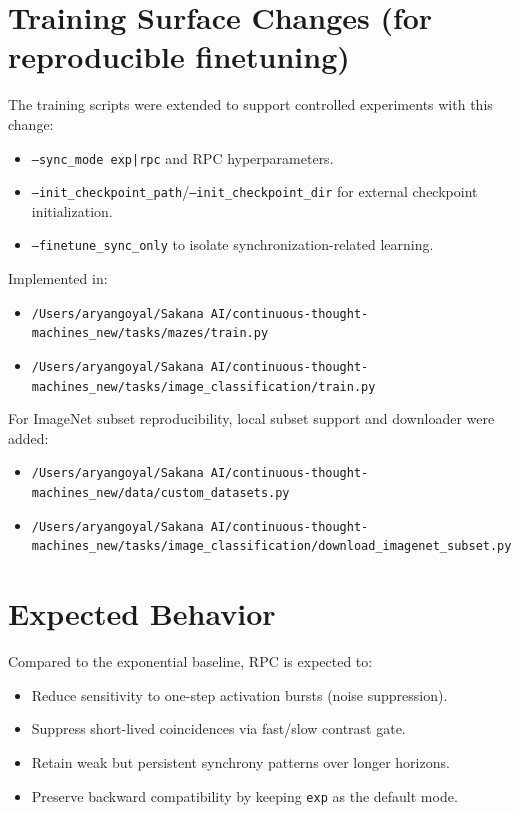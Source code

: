 \documentclass[11pt]{article}
\begin{document}
\section{Training Surface Changes (for reproducible finetuning)}
The training scripts were extended to support controlled experiments with this change:
\begin{itemize}
  \item \texttt{--sync\_mode exp|rpc} and RPC hyperparameters.
  \item \texttt{--init\_checkpoint\_path}/\texttt{--init\_checkpoint\_dir} for external checkpoint initialization.
  \item \texttt{--finetune\_sync\_only} to isolate synchronization-related learning.
\end{itemize}
Implemented in:
\begin{itemize}
  \item \texttt{/Users/aryangoyal/Sakana AI/continuous-thought-machines\_new/tasks/mazes/train.py}
  \item \texttt{/Users/aryangoyal/Sakana AI/continuous-thought-machines\_new/tasks/image\_classification/train.py}
\end{itemize}
For ImageNet subset reproducibility, local subset support and downloader were added:
\begin{itemize}
  \item \texttt{/Users/aryangoyal/Sakana AI/continuous-thought-machines\_new/data/custom\_datasets.py}
  \item \texttt{/Users/aryangoyal/Sakana AI/continuous-thought-machines\_new/tasks/image\_classification/download\_imagenet\_subset.py}
\end{itemize}

\section{Expected Behavior}
Compared to the exponential baseline, RPC is expected to:
\begin{itemize}
  \item Reduce sensitivity to one-step activation bursts (noise suppression).
  \item Suppress short-lived coincidences via fast/slow contrast gate.
  \item Retain weak but persistent synchrony patterns over longer horizons.
  \item Preserve backward compatibility by keeping \texttt{exp} as the default mode.
\end{itemize}
\end{document}
